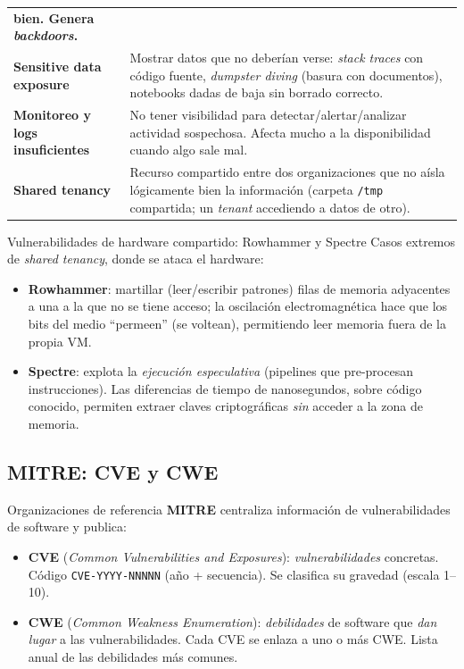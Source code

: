 \documentclass[11pt,a4paper]{article}
\begin{document}
\begin{center}
\begin{tabular}{>{\bfseries}p{4.2cm} p{9.6cm}}
  bien. Genera \emph{backdoors}.\\
Sensitive data exposure & Mostrar datos que no deberían verse: \emph{stack traces} con código
  fuente, \emph{dumpster diving} (basura con documentos), notebooks dadas de baja sin borrado
  correcto.\\
Monitoreo y logs insuficientes & No tener visibilidad para detectar/alertar/analizar actividad
  sospechosa. Afecta mucho a la disponibilidad cuando algo sale mal.\\
Shared tenancy & Recurso compartido entre dos organizaciones que no aísla lógicamente bien la
  información (carpeta \texttt{/tmp} compartida; un \emph{tenant} accediendo a datos de otro).\\
\bottomrule
\end{tabular}
\end{center}

\begin{warnbox}{Vulnerabilidades de hardware compartido: Rowhammer y Spectre}
Casos extremos de \emph{shared tenancy}, donde se ataca el hardware:
\begin{itemize}[leftmargin=1.3em,itemsep=2pt]
  \item \textbf{Rowhammer}: martillar (leer/escribir patrones) filas de memoria adyacentes a
        una a la que no se tiene acceso; la oscilación electromagnética hace que los bits del
        medio ``permeen'' (se voltean), permitiendo leer memoria fuera de la propia VM.
  \item \textbf{Spectre}: explota la \emph{ejecución especulativa} (pipelines que pre-procesan
        instrucciones). Las diferencias de tiempo de nanosegundos, sobre código conocido,
        permiten extraer claves criptográficas \emph{sin} acceder a la zona de memoria.
\end{itemize}
\end{warnbox}

\subsection{MITRE: CVE y CWE}

\begin{defbox}{Organizaciones de referencia}
\textbf{MITRE} centraliza información de vulnerabilidades de software y publica:
\begin{itemize}[leftmargin=1.4em,itemsep=1pt]
  \item \textbf{CVE} (\emph{Common Vulnerabilities and Exposures}): \emph{vulnerabilidades}
        concretas. Código \texttt{CVE-YYYY-NNNNN} (año + secuencia). Se clasifica su gravedad
        (escala 1--10).
  \item \textbf{CWE} (\emph{Common Weakness Enumeration}): \emph{debilidades} de software que
        \emph{dan lugar} a las vulnerabilidades. Cada CVE se enlaza a uno o más CWE. Lista
        anual de las debilidades más comunes.
\end{itemize}
\end{defbox}
\end{document}

